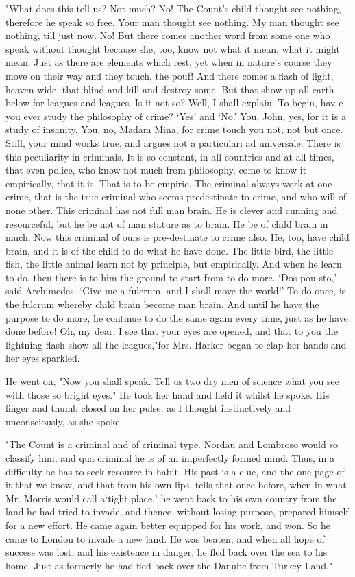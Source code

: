 "What does this tell us? Not much? No! The Count's child thought see nothing, therefore he speak so free. Your man thought see nothing. My man thought see nothing, till just now. No! But there comes another word from some one who speak without thought because she, too, know not what it mean, what it might mean. Just as there are elements which rest, yet when in nature's course they move on their way and they touch, the pouf! And there comes a flash of light, heaven wide, that blind and kill and destroy some. But that show up all earth below for leagues and leagues. Is it not so? Well, I shall explain. To begin, hav e you ever study the philosophy of crime? `Yes' and `No.' You, John, yes, for it is a study of insanity. You, no, Madam Mina, for crime touch you not, not but once. Still, your mind works true, and argues not a particulari ad universale. There is this peculiarity in criminals. It is so constant, in all countries and at all times, that even police, who know not much from philosophy, come to know it empirically, that it is. That is to be empiric. The criminal always work at one crime, that is the true criminal who seems predestinate to crime, and who will of none other. This criminal has not full man brain. He is clever and cunning and resourceful, but he be not of man stature as to brain. He be of child brain in much. Now this criminal of ours is pre-destinate to crime also. He, too, have child brain, and it is of the child to do what he have done. The little bird, the little fish, the little animal learn not by principle, but empirically. And when he learn to do, then there is to him the ground to start from to do more. `Dos pou sto,' said Archimedes. `Give me a fulcrum, and I shall move the world!' To do once, is the fulcrum whereby child brain become man brain. And until he have the purpose to do more, he continue to do the same again every time, just as he have done before! Oh, my dear, I see that your eyes are opened, and that to you the lightning flash show all the leagues,"for Mrs. Harker began to clap her hands and her eyes sparkled. 

He went on, "Now you shall speak. Tell us two dry men of science what you see with those so bright eyes." He took her hand and held it whilst he spoke. His finger and thumb closed on her pulse, as I thought instinctively and unconsciously, as she spoke. 

"The Count is a criminal and of criminal type. Nordau and Lombroso would so classify him, and qua criminal he is of an imperfectly formed mind. Thus, in a difficulty he has to seek resource in habit. His past is a clue, and the one page of it that we know, and that from his own lips, tells that once before, when in what Mr. Morris would call a`tight place,' he went back to his own country from the land he had tried to invade, and thence, without losing purpose, prepared himself for a new effort. He came again better equipped for his work, and won. So he came to London to invade a new land. He was beaten, and when all hope of success was lost, and his existence in danger, he fled back over the sea to his home. Just as formerly he had fled back over the Danube from Turkey Land." 

